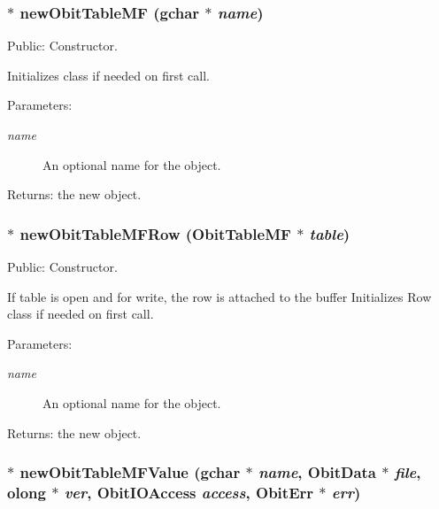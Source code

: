 \subsubsection{$\ast$ new\-Obit\-Table\-MF (gchar $\ast$ {\em name})}\label{ObitTableMF_8c_a16}


Public: Constructor. 

Initializes class if needed on first call. \begin{Desc}
\item[Parameters:]
\begin{description}
\item[{\em name}]An optional name for the object. \end{description}
\end{Desc}
\begin{Desc}
\item[Returns:]the new object. \end{Desc}
\subsubsection{$\ast$ new\-Obit\-Table\-MFRow ({\bf Obit\-Table\-MF} $\ast$ {\em table})}\label{ObitTableMF_8c_a14}


Public: Constructor. 

If table is open and for write, the row is attached to the buffer Initializes Row class if needed on first call. \begin{Desc}
\item[Parameters:]
\begin{description}
\item[{\em name}]An optional name for the object. \end{description}
\end{Desc}
\begin{Desc}
\item[Returns:]the new object. \end{Desc}
\subsubsection{$\ast$ new\-Obit\-Table\-MFValue (gchar $\ast$ {\em name}, {\bf Obit\-Data} $\ast$ {\em file}, {\bf olong} $\ast$ {\em ver}, Obit\-IOAccess {\em access}, {\bf Obit\-Err} $\ast$ {\em err})}\label{ObitTableMF_8c_a18}


